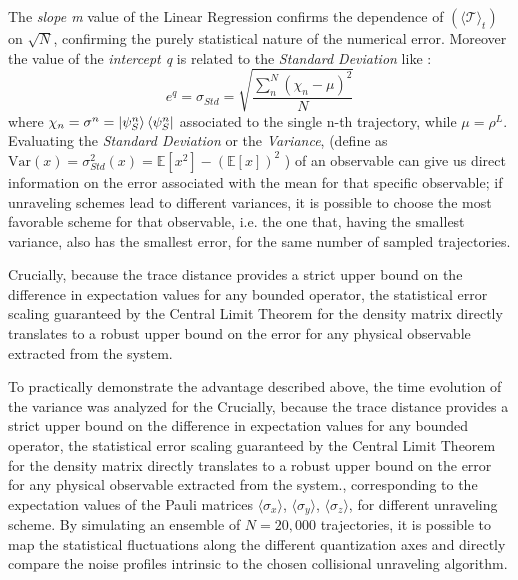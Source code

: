 \documentclass[a4paper,12pt]{article}
\begin{document}
The \textit{slope m} value of the Linear Regression confirms the dependence of $ \left(\langle \mathcal{T}\rangle_{t}\right) $ on $\sqrt{N}$, confirming the purely statistical nature of the numerical error. Moreover the value of the \textit{intercept q} is related to the \textit{Standard Deviation} like :
\begin{equation}
	e^{q} = \sigma_{Std} = \sqrt{\frac{\sum_{n}^{N}\left(\chi_{n} - \mu\right)^{2}}{N}}
\end{equation}
where $ \chi_{n} = \sigma^{n} = \ket{\psi_{S}^{n}}\bra{\psi_{S}^{n}} $
associated to the single n-th trajectory, while $ \mu = \rho^{L} $. \newline
Evaluating the \textit{Standard Deviation} or the \textit{Variance}, (define as $ \text{Var}(x) = \sigma_{Std}^{2}(x) = \mathbb{E}[x^2] - (\mathbb{E}[x])^2 $ ) of an observable can give us direct information on the error associated with the mean for that specific observable; if unraveling schemes lead to different variances, it is possible to choose the most favorable scheme for that observable, i.e. the one that, having the smallest variance, also has the smallest error, for the same number of sampled trajectories.

Crucially, because the trace distance provides a strict upper bound on the difference in expectation values for any bounded operator, the statistical error scaling guaranteed by the Central Limit Theorem for the density matrix directly translates to a robust upper bound on the error for any physical observable extracted from the system.

To practically demonstrate the advantage described above, the time evolution of the variance was analyzed for the Crucially, because the trace distance provides a strict upper bound on the difference in expectation values for any bounded operator, the statistical error scaling guaranteed by the Central Limit Theorem for the density matrix directly translates to a robust upper bound on the error for any physical observable extracted from the system., corresponding to the expectation values of the Pauli matrices $\langle \sigma_x \rangle$, $\langle \sigma_y \rangle$, $\langle \sigma_z \rangle$, for different unraveling scheme. By simulating an ensemble of $N = 20,000$ trajectories, it is possible to map the statistical fluctuations along the different quantization axes and directly compare the noise profiles intrinsic to the chosen collisional unraveling algorithm. 

\newpage
\end{document}
